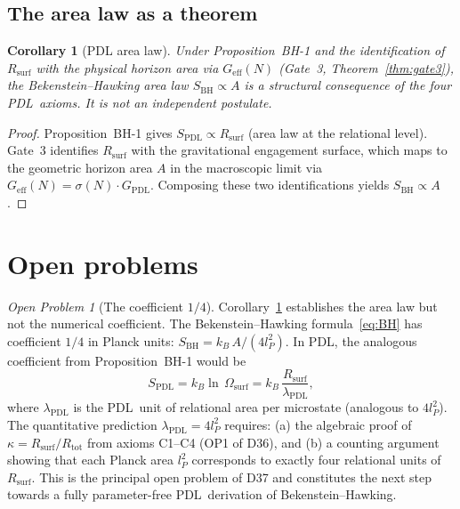 \documentclass[11pt,a4paper]{article}
\theoremstyle{plain}
\newtheorem{corollary}[theorem]{Corollary}
\theoremstyle{definition}
\theoremstyle{remark}
\newtheorem{openprob}{Open Problem}
\newcommand{\PDL}{\textsc{PDL}}
\newcommand{\Rtot}{R_{\mathrm{tot}}}
\newcommand{\Rsurf}{R_{\mathrm{surf}}}
\newcommand{\kap}{\kappa}
\newcommand{\sig}{\sigma}
\newcommand{\GPDL}{G_{\mathrm{PDL}}}
\newcommand{\Geff}{G_{\mathrm{eff}}}
\newcommand{\SBH}{S_{\mathrm{BH}}}
\newcommand{\SPDL}{S_{\mathrm{PDL}}}
\newcommand{\lP}{l_P}
\begin{document}
\subsection{The area law as a theorem}

\begin{corollary}[PDL area law]
\label{cor:area_law}
Under Proposition~BH-1 and the identification of $\Rsurf$ with the physical horizon
area via $\Geff(N)$ (Gate~3, Theorem~\ref{thm:gate3}), the Bekenstein--Hawking area
law $\SBH \propto A$ is a structural consequence of the four \PDL\ axioms. It is not
an independent postulate.
\end{corollary}

\begin{proof}
Proposition~BH-1 gives $\SPDL \propto \Rsurf$ (area law at the relational level).
Gate~3 identifies $\Rsurf$ with the gravitational engagement surface, which maps to
the geometric horizon area $A$ in the macroscopic limit via $\Geff(N) = \sig(N)\cdot\GPDL$.
Composing these two identifications yields $\SBH \propto A$.
\end{proof}

\section{Open problems}
\label{sec:open}

\begin{openprob}[The coefficient $1/4$]
\label{op:quarter}
Corollary~\ref{cor:area_law} establishes the area law but not the numerical
coefficient. The Bekenstein--Hawking formula~\eqref{eq:BH} has coefficient $1/4$
in Planck units: $\SBH = k_B\,A/(4\lP^2)$.
In \PDL, the analogous coefficient from Proposition~BH-1 would be
\begin{equation}
  \SPDL = k_B\ln\,\Omega_{\mathrm{surf}} = k_B\,\frac{\Rsurf}{\lambda_{\mathrm{PDL}}},
  \label{eq:coeff}
\end{equation}
where $\lambda_{\mathrm{PDL}}$ is the \PDL\ unit of relational area per microstate
(analogous to $4\lP^2$). The quantitative prediction $\lambda_{\mathrm{PDL}} = 4\lP^2$
requires: (a) the algebraic proof of $\kap = \Rsurf/\Rtot$ from axioms C1--C4 (OP1
of D36), and (b) a counting argument showing that each Planck area $\lP^2$ corresponds
to exactly four relational units of $\Rsurf$. This is the principal open problem of
D37 and constitutes the next step towards a fully parameter-free \PDL\ derivation
of Bekenstein--Hawking.
\end{openprob}
\end{document}
